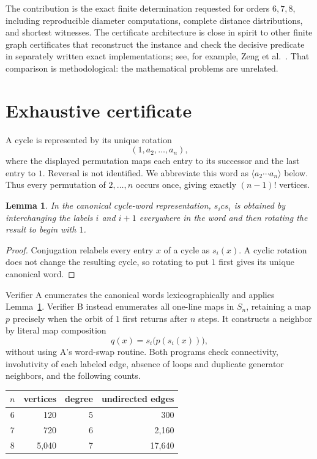 \documentclass[11pt]{article}
\newtheorem{lemma}[theorem]{Lemma}
\newcommand{\cyc}[1]{\langle #1\rangle}
\begin{document}
The contribution is the exact finite determination requested for orders
$6,7,8$, including reproducible diameter computations, complete distance
distributions, and shortest witnesses.  The certificate architecture is close
in spirit to other finite graph certificates that reconstruct the instance and
check the decisive predicate in separately written exact implementations; see,
for example, Zeng et al.~\cite[Sections 6--7]{ZengEtAl2026FiniteCertificates}.
That comparison is methodological: the mathematical problems are unrelated.

\section{Exhaustive certificate}

A cycle is represented by its unique rotation
\[
  (1,a_2,\ldots,a_n),
\]
where the displayed permutation maps each entry to its successor and the last
entry to $1$.  Reversal is not identified.  We abbreviate this word as
$\cyc{a_2\cdots a_n}$ below.  Thus every permutation of $2,\ldots,n$ occurs
once, giving exactly $(n-1)!$ vertices.

\begin{lemma}\label{lem:edge}
In the canonical cycle-word representation, $s_i c s_i$ is obtained by
interchanging the labels $i$ and $i+1$ everywhere in the word and then rotating
the result to begin with $1$.
\end{lemma}

\begin{proof}
Conjugation relabels every entry $x$ of a cycle as $s_i(x)$.  A cyclic rotation
does not change the resulting cycle, so rotating to put $1$ first gives its
unique canonical word.
\end{proof}

Verifier A enumerates the canonical words lexicographically and applies
Lemma~\ref{lem:edge}.  Verifier B instead enumerates all one-line maps in
$S_n$, retaining a map $p$ precisely when the orbit of $1$ first returns after
$n$ steps.  It constructs a neighbor by literal map composition
\[
 q(x)=s_i\bigl(p(s_i(x))\bigr),
\]
without using A's word-swap routine.  Both programs check connectivity,
involutivity of each labeled edge, absence of loops and duplicate generator
neighbors, and the following counts.

\begin{center}
\begin{tabular}{crrr}
\toprule
$n$ & vertices & degree & undirected edges\\
\midrule
6&120&5&300\\
7&720&6&2,160\\
8&5,040&7&17,640\\
\bottomrule
\end{tabular}
\end{center}
\end{document}
